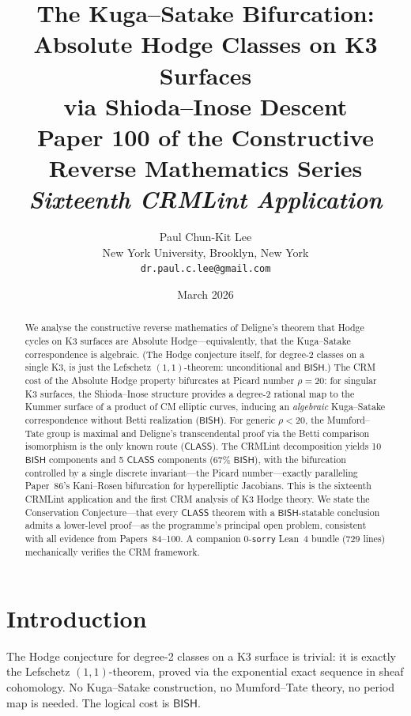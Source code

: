 \documentclass[11pt,a4paper]{article}
\title{\textbf{The Kuga--Satake Bifurcation:\\
Absolute Hodge Classes on K3 Surfaces\\
via Shioda--Inose Descent}\\[6pt]
\large Paper 100 of the Constructive Reverse Mathematics Series\\[6pt]
\normalsize\textit{Sixteenth CRMLint Application}}
\author{Paul Chun-Kit Lee\\
\small New York University, Brooklyn, New York\\
\small\texttt{dr.paul.c.lee@gmail.com}}
\date{March 2026}
\theoremstyle{plain}
\theoremstyle{definition}
\newcommand{\BISH}{\textsf{BISH}}
\newcommand{\CLASS}{\textsf{CLASS}}
\begin{document}
\maketitle

\begin{abstract}
We analyse the constructive reverse mathematics of Deligne's theorem that Hodge cycles on K3 surfaces are Absolute Hodge---equivalently, that the Kuga--Satake correspondence is algebraic.
(The Hodge conjecture itself, for degree-2 classes on a single K3, is just the Lefschetz $(1,1)$-theorem: unconditional and $\BISH$.)
The CRM cost of the Absolute Hodge property bifurcates at Picard number $\rho = 20$: for singular K3 surfaces, the Shioda--Inose structure provides a degree-2 rational map to the Kummer surface of a product of CM elliptic curves, inducing an \emph{algebraic} Kuga--Satake correspondence without Betti realization ($\BISH$).
For generic $\rho < 20$, the Mumford--Tate group is maximal and Deligne's transcendental proof via the Betti comparison isomorphism is the only known route ($\CLASS$).
The CRMLint decomposition yields 10 $\BISH$ components and 5 $\CLASS$ components (67\% $\BISH$), with the bifurcation controlled by a single discrete invariant---the Picard number---exactly paralleling Paper~86's Kani--Rosen bifurcation for hyperelliptic Jacobians.
This is the sixteenth CRMLint application and the first CRM analysis of K3 Hodge theory.
We state the Conservation Conjecture---that every $\CLASS$ theorem with a $\BISH$-statable conclusion admits a lower-level proof---as the programme's principal open problem, consistent with all evidence from Papers~84--100.
A companion 0-\texttt{sorry} Lean~4 bundle (729 lines) mechanically verifies the CRM framework.
\end{abstract}

\tableofcontents
\newpage

\section{Introduction}\label{sec:intro}

The Hodge conjecture for degree-2 classes on a K3 surface is trivial: it is exactly the Lefschetz $(1,1)$-theorem, proved via the exponential exact sequence in sheaf cohomology. No Kuga--Satake construction, no Mumford--Tate theory, no period map is needed. The logical cost is $\BISH$.
\end{document}
